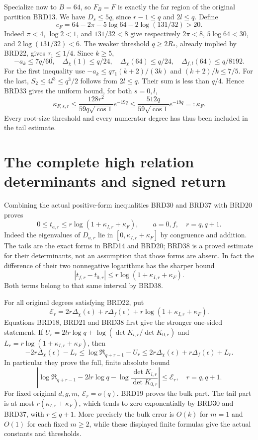 \documentclass[11pt,a4paper]{article}
\begin{document}
Specialize now to $B=64$, so $F_B=F$ is exactly the far region
of the original partition BRD13. We have $D_s\leq5q$, since $r-1\leq q$ and
$2l\leq q$. Define
\[
 c_F=64-2\pi-5\log64-2\log(131/32)>20.
\tag{BRD35}
\]
Indeed $\pi<4$, $\log2<1$, and $131/32<8$ give respectively
$2\pi<8$, $5\log64<30$, and $2\log(131/32)<6$.
The weaker threshold $q\geq2R_*$, already implied by BRD22,
gives $\tau_1\leq1/4$. Since $k\geq5$,
\[
 -a_k\leq7q/60,\quad \Delta_\chi(1)\leq q/24,
 \quad\Delta_\chi(64)\leq q/24,
 \quad\Delta_{f,l}(64)\leq q/8192.
\tag{BRD36}
\]
For the first inequality use
$-a_k\leq q\tau_1(k+2)/(3k)$ and $(k+2)/k\leq7/5$.
For the last, $S_2\leq4l^3\leq q^3/2$ follows from
$2l\leq q$. Their sum is less than $q/4$. Hence BRD33 gives
the uniform bound, for both $s=0,l$,
\[
 \kappa_{F,s,r}\leq
 \frac{128r^2}{59q\sqrt{\cos1}}e^{-19q}
 \leq\frac{512q}{59\sqrt{\cos1}}e^{-19q}
 =:\kappa_F.
\tag{BRD37}
\]
Every root-size threshold and every numerator degree has thus
been included in the tail estimate.

\section{The complete high relation determinants and signed return}

Combining the actual positive-form inequalities BRD30 and BRD37
with BRD20 proves
\[
 0\leq t_{a,r}\leq r\log(1+\kappa_{I,r}+\kappa_F),
 \qquad a=0,f,\quad r=q,q+1.
\tag{BRD38}
\]
Indeed the eigenvalues of $D_{a,r}$ lie in
$[0,\kappa_{I,r}+\kappa_F]$ by congruence and addition.
The tails are the exact forms in BRD14 and BRD20; BRD38 is a
proved estimate for their determinants, not an assumption that
those forms are absent. In fact the difference of their two
nonnegative logarithms has the sharper bound
\[
 |t_{f,r}-t_{0,r}|\leq r\log(1+\kappa_{I,r}+\kappa_F).
\tag{BRD39}
\]
Both terms belong to that same interval by BRD38.

For all original degrees satisfying BRD22, put
\[
 \mathcal E_r=2r\Delta_\chi(\epsilon)+r\Delta_f(\epsilon)
              +r\log(1+\kappa_{I,r}+\kappa_F).
\tag{BRD40}
\]
Equations BRD18, BRD21 and BRD38 first give the stronger
one-sided statement. If
$U_r=2lr\log q+\log(\det K_{l,r}/\det K_{0,r})$ and
$L_r=r\log(1+\kappa_{I,r}+\kappa_F)$, then
\[
 -2r\Delta_\chi(\epsilon)-L_r
 \leq\log\mathfrak R_{q+r-1}-U_r
 \leq2r\Delta_\chi(\epsilon)+r\Delta_f(\epsilon)+L_r.
\tag{BRD41a}
\]
In particular they prove the full, finite absolute bound
\[
 \boxed{\left|\log\mathfrak R_{q+r-1}
    -2lr\log q-\log\frac{\det K_{l,r}}{\det K_{0,r}}
       \right|\leq\mathcal E_r,
       \quad r=q,q+1.}
\tag{BRD41}
\]
For fixed original $d,g,m$, $\mathcal E_r=o(q)$.
BRD19 proves the bulk part. The tail part is at most
$r(\kappa_{I,r}+\kappa_F)$, which tends to zero exponentially
by BRD30 and BRD37, with $r\leq q+1$.
More precisely the bulk error is $O(k)$ for $m=1$ and
$O(1)$ for each fixed $m\geq2$, while these displayed finite
formulas give the actual constants and thresholds.
\end{document}
